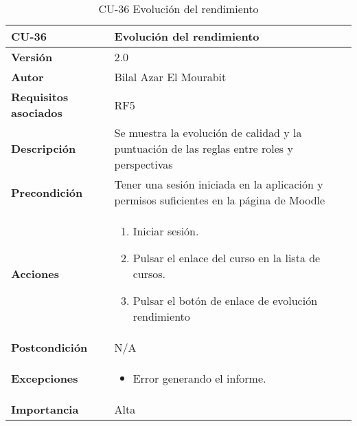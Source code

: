 \begin{table}[H]
	\centering
	\begin{tabularx}{\linewidth}{ p{} p{} }
		\toprule
		\textbf{CU-36}    & \textbf{Evolución del rendimiento}\\
		\toprule
		\textbf{Versión}              & 2.0    \\
		\textbf{Autor}                & Bilal Azar El Mourabit \\
		\textbf{Requisitos asociados} & RF5\\
		\textbf{Descripción}          & Se muestra la evolución de calidad y la puntuación de las reglas entre roles y perspectivas\\
    		\textbf{Precondición}         & Tener una sesión iniciada en la aplicación y permisos suficientes en la página de Moodle\\
		\textbf{Acciones}             & 
		\begin{enumerate}
			\def\labelenumi{\arabic{enumi}.}
			\tightlist
			\item Iniciar sesión.
            \item Pulsar el enlace del curso en la lista de cursos.
            \item Pulsar el botón de enlace de evolución rendimiento
		\end{enumerate}\\
		\textbf{Postcondición}        & N/A \\
		\textbf{Excepciones}          & \begin{itemize}
		    \item Error generando el informe.
		\end{itemize} \\
		\textbf{Importancia}          & Alta \\
		\bottomrule
	\end{tabularx}
	\caption{CU-36 Evolución del rendimiento}
\end{table}

